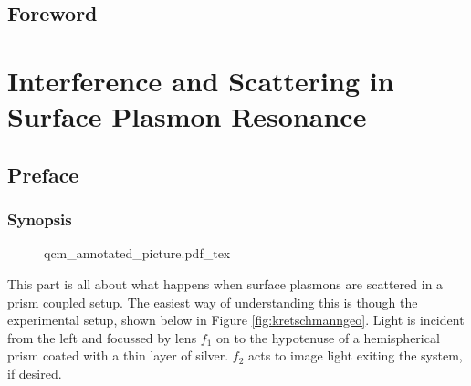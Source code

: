 \documentclass[a4paper,titlepage,onecolumn]{report}
\newcommand{\Figure}[1]{Figure \ref{#1}}
\begin{document}
\chapter*{Foreword}

\part{Interference and Scattering in Surface Plasmon Resonance}
\label{part:plasmon}
\chapter{Preface}
\section{Synopsis}
\begin{figure}[hb]
\centering
{qcm_annotated_picture.pdf_tex}
\end{figure}

This part is all about what happens when surface plasmons are
scattered in a prism coupled setup.  The easiest way of understanding this
is though the experimental setup, shown below in \Figure{fig:kretschmanngeo}.  
%
Light is incident from the left and focussed by lens $f_1$ on to the
hypotenuse of a hemispherical prism coated with a thin layer of silver.
$f_2$ acts to image light exiting the system, if desired.
\end{document}
